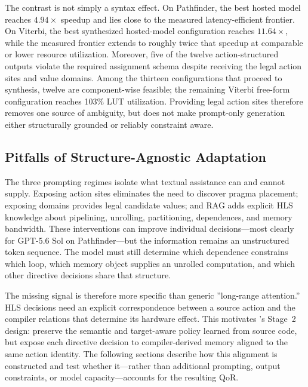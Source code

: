 The contrast is not simply a syntax effect. On Pathfinder, the best hosted model reaches $4.94\times$ speedup and lies close to the measured latency-efficient frontier. On Viterbi, the best synthesized hosted-model configuration reaches $11.64\times$, while the measured frontier extends to roughly twice that speedup at comparable or lower resource utilization. 
Moreover, five of the twelve action-structured outputs violate the required assignment schema despite receiving the legal action sites and value domains. Among the thirteen configurations that proceed to synthesis, twelve are component-wise feasible; the remaining Viterbi free-form configuration reaches 103\% LUT utilization. Providing legal action sites therefore removes one source of ambiguity, but does not make prompt-only generation either structurally grounded or reliably constraint aware.


\subsection{Pitfalls of Structure-Agnostic Adaptation}

The three prompting regimes isolate what textual assistance can and cannot supply. Exposing action sites eliminates the need to discover pragma placement; exposing domains provides legal candidate values; and RAG adds explicit HLS knowledge about pipelining, unrolling, partitioning, dependences, and memory bandwidth. These interventions can improve individual decisions---most clearly for GPT-5.6 Sol on Pathfinder---but the information remains an unstructured token sequence. The model must still determine which dependence constrains which loop, which memory object supplies an unrolled computation, and which other directive decisions share that structure.

The missing signal is therefore more specific than generic ''long-range attention.'' HLS decisions need an explicit correspondence between a source action and the compiler relations that determine its hardware effect. This motivates \framework's Stage~2 design: preserve the semantic and target-aware policy learned from source code, but expose each directive decision to compiler-derived memory aligned to the same action identity. The following sections describe how this alignment is constructed and test whether it---rather than additional prompting, output constraints, or model capacity---accounts for the resulting QoR.